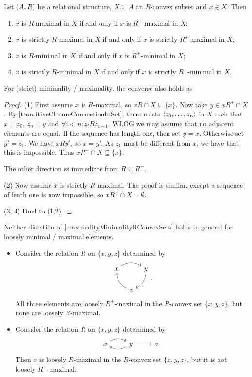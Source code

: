 \begin{proposition} \label{maximalityMinimalityRConvexSets}
Let $\left( A,R \right)$ be a relational structure, $X\subseteq A$ an $R$-convex subset and $x\in X$. Then 
\begin{enumerate}
\item $x$ is $R$-maximal in $X$ \textup{if and only if} $x$ is $R^+$-maximal in $X$;
\item $x$ is strictly $R$-maximal in $X$ \textup{if and only if} $x$ is strictly $R^+$-maximal in $X$;
\item $x$ is $R$-minimal in $X$ \textup{if and only if} $x$ is  $R^+$-minimal in $X$;
\item $x$ is strictly $R$-minimal in $X$ \textup{if and only if} $x$ is strictly $R^+$-minimal in $X$.
\end{enumerate}
\end{proposition}
For (strict) minimality / maximality, the converse also holds as 
\begin{proof}
(1) First assume $x$ is $R$-maximal, so $xR \cap X \subseteq \{x\}$. Now take $y\in xR^+\cap X$. By \ref{transitiveClosureConnectionInSet}, there exists $\left\langle z_0, \ldots, z_n \right\rangle$ in $X$ such that $x = z_0$, $z_n = y$ and $\forall i<n: z_iRz_{i+1}$. WLOG we may assume that no adjacent elements are equal. If the sequence has length one, then set $y = x$. Otherwise set $y' = z_1$. We have $xRy'$, so $x=y'$. As $z_1$ must be different from $x$, we have that this is impossible. Thus $xR^+\cap X \subseteq \{x\}$.

The other direction ss immediate from $R \subseteq R^+$.

(2) Now assume $x$ is strictly $R$-maximal. The proof is similar, except a sequence of lenth one is now impossible, so $xR^+\cap X = \emptyset$.

(3, 4) Dual to (1,2).
\end{proof}

\begin{example}
Neither direction of \ref{maximalityMinimalityRConvexSets} holds in general for loosely minimal / maximal elements.
\begin{itemize}
\item Consider the relation $R$ on $\{x,y,z\}$ determined by
\[ \begin{tikzcd}[column sep=0.8em]
x \arrow[rr, bend left] & {} & y \arrow[dl, bend left] \\
{} & z \arrow[ul, bend left] & {}
\end{tikzcd}. \]
All three elements are loosely $R^+$-maximal in the $R$-convex set $\{x,y,z\}$, but none are loosely $R$-maximal.
\item Consider the relation $R$ on $\{x,y,z\}$ determined by
\[ \begin{tikzcd}
x \arrow[r, bend left] & \arrow[l, bend left] y \arrow[r] & z.
\end{tikzcd} \]
Then $x$ is loosely $R$-maximal in the $R$-convex set $\{x,y,z\}$, but it is not loosely $R^+$-maximal.
\end{itemize}
\end{example}

